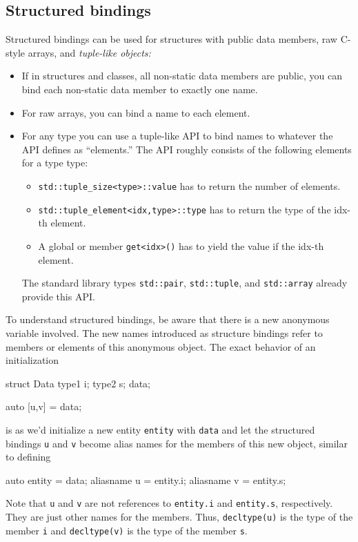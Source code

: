 \documentclass[../main]{subfiles}
\begin{document}
\subsection{Structured bindings}
    Structured bindings can be used for structures with public data members, raw C-style arrays, and \textit{tuple-like objects:}
\begin{itemize}
    \item If in structures and classes, all non-static data members are public, you can bind each non-static
    data member to exactly one name.
    \item For raw arrays, you can bind a name to each element.
    \item For any type you can use a tuple-like API to bind names to whatever the API defines as “elements.”
    The API roughly consists of the following elements for a type type:
    \begin{itemize}
        \item \texttt{std::tuple\_size<type>::value} has to return the number of elements.
        \item \texttt{std::tuple\_element<idx,type>::type} has to return the type of the idx-th element.
        \item A global or member \texttt{get<idx>()} has to yield the value if the idx-th element.
    \end{itemize}
    The standard library types \texttt{std::pair}, \texttt{std::tuple}, and \texttt{std::array} already provide this API.
\end{itemize}

    To understand structured bindings, be aware that there is a new anonymous
variable involved. The new names introduced as structure bindings refer to members or elements of this
anonymous object. The exact behavior of an initialization
\begin{Code}
    struct Data
    {
        type1 i;
        type2 s;
    } data;
    
    auto [u,v] = data;
\end{Code}
is as we’d initialize a new entity \texttt{entity} with \texttt{data} and let the structured bindings \texttt{u} and \texttt{v} become
alias names for the members of this new object, similar to defining
\begin{Code}
    auto entity = data;
    aliasname u = entity.i;
    aliasname v = entity.s;
\end{Code}
\noindent
Note that \texttt{u} and \texttt{v} are not references to \texttt{entity.i} and \texttt{entity.s}, respectively. They are just other names for the
members. Thus, \texttt{decltype(u)} is the type of the member \texttt{i} and \texttt{decltype(v)} is the type of the member \texttt{s}.
\end{document}
